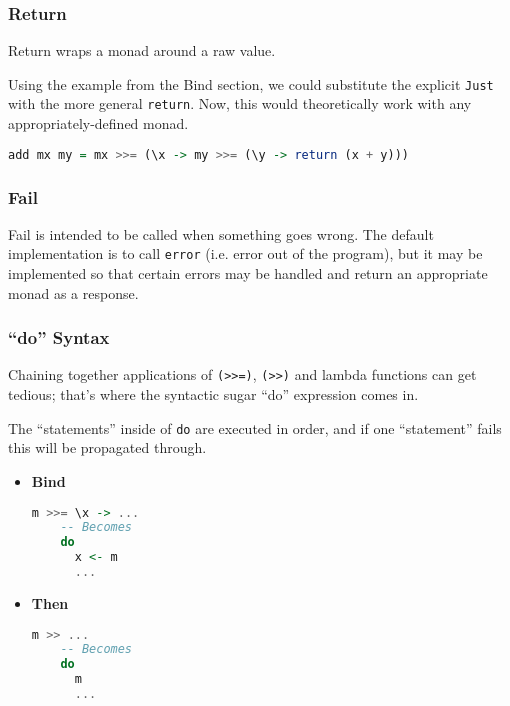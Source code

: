 \subsubsection{Return}

Return wraps a monad around a raw value.

Using the example from the Bind section, we could substitute the explicit \texttt{Just} with the more general \texttt{return}. Now, this would theoretically work with any appropriately-defined monad.

\begin{lstlisting}[language=haskell]
  add mx my = mx >>= (\x -> my >>= (\y -> return (x + y)))
\end{lstlisting}

\subsubsection{Fail}

Fail is intended to be called when something goes wrong. The default implementation is to call \texttt{error} (i.e. error out of the program), but it may be implemented so that certain errors may be handled and return an appropriate monad as a response.

\subsubsection{``do'' Syntax}

Chaining together applications of \texttt{(>>=)}, \texttt{(>>)} and lambda functions can get tedious; that's where the syntactic sugar ``do'' expression comes in.

The ``statements'' inside of \texttt{do} are executed in order, and if one ``statement'' fails this will be propagated through.

\begin{itemize}
  \item \textbf{Bind} \begin{lstlisting}[language=haskell]
    m >>= \x -> ...
    -- Becomes
    do
      x <- m
      ...
  \end{lstlisting}
  \item \textbf{Then} \begin{lstlisting}[language=haskell]
    m >> ...
    -- Becomes
    do
      m
      ...
  \end{lstlisting}
\end{itemize}

